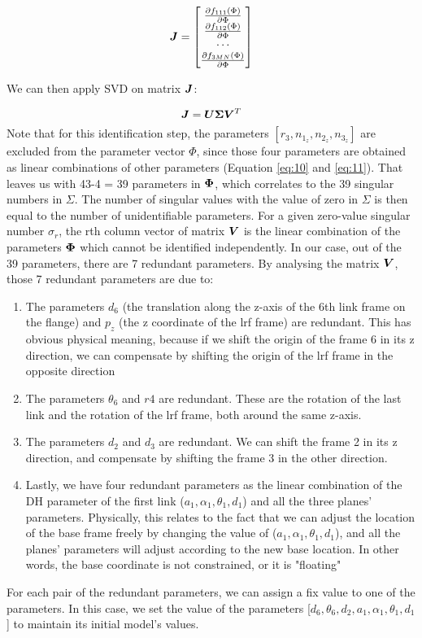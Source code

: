 \renewcommand\arraystretch{1.5}
\begin{equation}
\vb*{J} = \begin{bmatrix}
 \frac{\partial f_{111}(\Phi)}{\partial\Phi}\\
 \frac{\partial f_{112}(\Phi)}{\partial\Phi}\\
 \cdots \\
 \frac{\partial f_{3MN}(\Phi)}{\partial\Phi}\\
	\end{bmatrix}
\end{equation}

We can then apply SVD on matrix $\vb*{J}$:

\begin{equation}
 \vb*{J} = \vb*{U}\vb*{\Sigma}\vb*{V}^T
\end{equation}
Note that for this identification step, the parameters $[r_3, n_{1_z}, n_{2_z}, n_{3_z}]$ are excluded from the parameter vector $\Phi$, since those four parameters are obtained as linear combinations of other parameters (Equation \eqref{eq:10} and \eqref{eq:11}). That leaves us with 43-4 = 39 parameters in $\vb*{\Phi}$, which correlates to the 39 singular numbers in $\Sigma$. The number of singular values with the value of zero in $\Sigma$ is then equal to the number of unidentifiable parameters. For a given zero-value singular number $\sigma_r$, the rth column vector of matrix $\vb*{V}$ is the linear combination of the parameters $\vb*{\Phi}$ which cannot be identified independently. 
In our case, out of the 39 parameters, there are 7 redundant parameters. By analysing the matrix $\vb*{V}$, those 7 redundant parameters are due to:
\begin{enumerate}
\item The parameters $d_6$ (the translation along the z-axis of the 6th link frame on the flange) and $p_z$ (the z coordinate of the \ac{lrf} frame) are redundant. This has obvious physical meaning, because if we shift the origin of the frame 6 in its z direction, we can compensate by shifting the origin of the \ac{lrf} frame in the opposite direction
\item The parameters $\theta_6$ and $r4$ are redundant. These are the rotation of the last link and the rotation of the \ac{lrf} frame, both around the same z-axis. 
\item The parameters $d_2$ and $d_3$ are redundant. We can shift the frame 2 in its z direction, and compensate by shifting the frame 3 in the other direction. 
\item Lastly, we have four redundant parameters as the linear combination of the DH parameter of the first link ($a_1, \alpha_1, \theta_1, d_1$) and all the three planes' parameters. Physically, this relates to the fact that we can adjust the location of the base frame freely by changing the value of ($a_1, \alpha_1, \theta_1, d_1$), and all the planes' parameters will adjust according to the new base location. In other words, the base coordinate is not constrained, or it is "floating"
\end{enumerate}

For each pair of the redundant parameters, we can assign a fix value to one of the parameters. In this case, we set the value of the parameters [$d_6, \theta_6, d_2, a_1, \alpha_1, \theta_1, d_1$] to maintain its initial model's values. 
